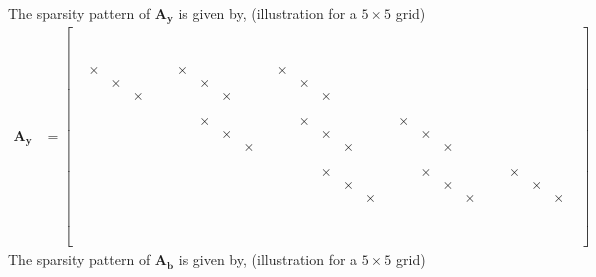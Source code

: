 \documentclass[12 pt, final]{article}
\renewcommand{\d}{\times}
\begin{document}
            The sparsity pattern of $\mathbf{A_y}$ is given by, (illustration for a $5\times5$ grid) 
            \begin{align*}
                \mathbf{A_y} &= \left[\begin{smallmatrix} 
                \\
                & \\
                && \\
                &&& \\
                &&&& \\
                &&&&& \\
                & \d &&&&& \d &&&&& \d\\
                && \d &&&&& \d &&&&& \d\\
                &&& \d &&&&& \d &&&&& \d\\
                &&&&&&&&& \\
                &&&&&&&&&& \\
                &&&&&&& \d &&&&& \d &&&&& \d\\
                &&&&&&&& \d &&&&& \d &&&&& \d\\
                &&&&&&&&& \d &&&&& \d &&&&& \d\\
                &&&&&&&&&&&&&& \\
                &&&&&&&&&&&&&&& \\
                &&&&&&&&&&&&& \d &&&&& \d &&&&& \d\\
                &&&&&&&&&&&&&& \d &&&&& \d &&&&& \d\\
                &&&&&&&&&&&&&&& \d &&&&& \d &&&&& \d\\
                &&&&&&&&&&&&&&&&&&&&& \\
                &&&&&&&&&&&&&&&&&&&&&& \\
                &&&&&&&&&&&&&&&&&&&&&&& \\
                &&&&&&&&&&&&&&&&&&&&&&&& \\
                &&&&&&&&&&&&&&&&&&&&&&&&& \\
                &&&&&&&&&&&&&&&&&&&&&&&&&& \\
                \end{smallmatrix}\right]
            \end{align*}            
            The sparsity pattern of $\mathbf{A_b}$ is given by, (illustration for a $5\times5$ grid) 
\end{document}
